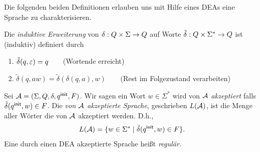 \begin{center}
\end{center}

Die folgenden beiden Definitionen erlauben uns mit Hilfe eines DEAs eine Sprache zu charakterisieren.
\begin{Def}[name={[Induktive erweiterung von $\delta$ auf Worte]}]\label{def:2.deltaschlange}
        Die \emph{induktive Erweiterung} von $\delta:Q\x\Sigma\->Q$ auf Worte $\tilde{\delta}: Q\x\Sigma^*\->Q$ ist (induktiv) definiert durch
  \begin{enumerate}
  \item $\tilde\delta(q,\varepsilon) =q$\ \ \ \  (Wortende erreicht)
  \item $\tilde\delta(q,aw)=\tilde\delta(\delta(q,a),w)$\ \ \ \ (Rest im Folgezustand verarbeiten)
  \end{enumerate}
\end{Def}
\begin{Def}[name={[Die durch einen \acs*{DEA} akzeptierte Sprache]}]\label{def:2.sprache}
        Sei $\mathcal{A}=(\Sigma, Q,\delta,{q^\mathsf{init}},F)$. 
        Wir sagen ein Wort $w\in\Sigma^*$ wird von $\mathcal{A}$ \emph{akzeptiert} falls $\tilde\delta({q^\mathsf{init}},w)\in F$.
        Die \emph{von $\mathcal{A}$ akzeptierte Sprache}, geschrieben $L(\mathcal{A})$, ist die Menge aller Wörter die von $\mathcal{A}$ akzeptiert werden. D.h., 
        \[ L(\mathcal{A}) = \{ w\in\Sigma^* \mid \tilde\delta({q^\mathsf{init}},w)\in F \}. \]
        Eine durch einen \ac{DEA} akzeptierte Sprache heißt \emph{regulär}.
\end{Def}

